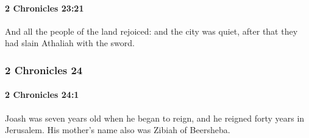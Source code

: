 		\paragraph{2 Chronicles 23:21} %
			\label{2CHRONICLES-23-21}

			And all the people of the land rejoiced: and the city was quiet, after that they had slain Athaliah with the sword.

	\subsubsection{2 Chronicles 24} %
		\label{2CHRONICLES-24}

		\paragraph{2 Chronicles 24:1} %
			\label{2CHRONICLES-24-1}

			Joash was seven years old when he began to reign, and he reigned forty years in Jerusalem. His mother's name also was Zibiah of Beersheba.

